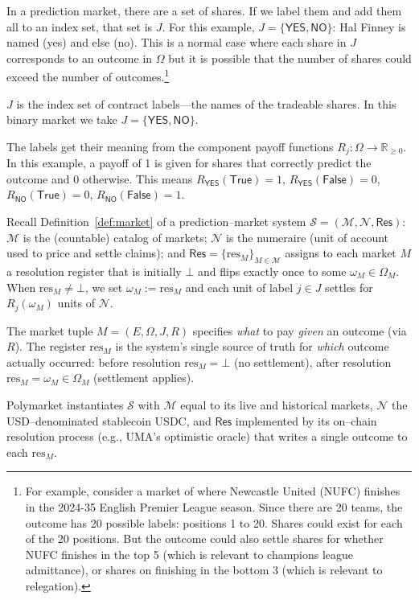 In a prediction market, there are a set of shares. If we label them and add them all to an index set, that set is $J$. For this example, $J=\{\textsf{YES},\textsf{NO}\}$: Hal Finney is named (yes) and else (no). This is a normal case where each share in $J$ corresponds to an outcome in $\Omega$ but it is possible that the number of shares could exceed the number of outcomes.\footnote{For example, consider a market of where Newcastle United (NUFC) finishes in the 2024-35 English Premier League season. Since there are 20 teams, the outcome has 20 possible labels: positions 1 to 20. Shares could exist for each of the 20 positions. But the outcome could also settle shares for whether NUFC finishes in the top 5 (which is relevant to champions league admittance), or shares on finishing in the bottom 3 (which is relevant to relegation).}

$J$ is the index set of contract labels—the names of the tradeable shares. In this binary market we take $J=\{\textsf{YES},\textsf{NO}\}$. 

The labels get their meaning from the component payoff functions $R_j:\Omega\to\mathbb{R}_{\ge 0}$. In this example, a payoff of 1 is given for shares that correctly predict the outcome and 0 otherwise. This means $R_{\textsf{YES}}(\mathsf{True})=1$, $R_{\textsf{YES}}(\mathsf{False})=0$, $R_{\textsf{NO}}(\mathsf{True})=0$, $R_{\textsf{NO}}(\mathsf{False})=1$.

Recall Definition~\ref{def:market} of a prediction--market system $\mathcal{S}=(\mathcal{M},\mathcal{N},\mathsf{Res})$:
$\mathcal{M}$ is the (countable) catalog of markets; $\mathcal{N}$ is the numeraire (unit of account used to price and settle claims);
and $\mathsf{Res}=\{\mathrm{res}_M\}_{M\in\mathcal{M}}$ assigns to each market $M$ a resolution register that is initially
$\bot$ and flips exactly once to some $\omega_M\in\Omega_M$.
When $\mathrm{res}_M\neq\bot$, we set $\omega_M:=\mathrm{res}_M$ and each unit of label $j\in J$ settles for $R_j(\omega_M)$ units of $\mathcal{N}$.

The market tuple $M=(E,\Omega,J,R)$ specifies \emph{what} to pay \emph{given} an outcome (via $R$).
The register $\mathrm{res}_M$ is the system’s single source of truth for \emph{which} outcome actually occurred:
before resolution $\mathrm{res}_M=\bot$ (no settlement), after resolution $\mathrm{res}_M=\omega_M\in\Omega_M$ (settlement applies).

Polymarket instantiates $\mathcal{S}$ with $\mathcal{M}$ equal to its live and historical markets, $\mathcal{N}$ the USD–denominated stablecoin USDC, and $\mathsf{Res}$ implemented by its on–chain resolution process (e.g., UMA’s optimistic oracle) that writes a single outcome to each $\mathrm{res}_M$.

